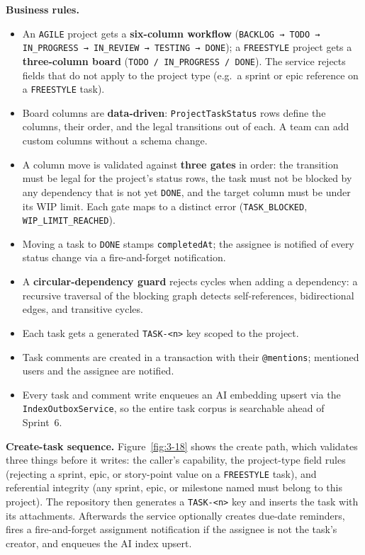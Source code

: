 \textbf{Business rules.}
\begin{itemize}
  \item An \texttt{AGILE} project gets a \textbf{six-column workflow}
    (\texttt{BACKLOG → TODO → IN\_PROGRESS → IN\_REVIEW → TESTING → DONE}); a \texttt{FREESTYLE}
    project gets a \textbf{three-column board} (\texttt{TODO / IN\_PROGRESS / DONE}). The service
    rejects fields that do not apply to the project type (e.g.\ a sprint or epic reference on a
    \texttt{FREESTYLE} task).
  \item Board columns are \textbf{data-driven}: \texttt{ProjectTaskStatus} rows define the columns,
    their order, and the legal transitions out of each. A team can add custom columns without a
    schema change.
  \item A column move is validated against \textbf{three gates} in order: the transition must be
    legal for the project's status rows, the task must not be blocked by any dependency that is not
    yet \texttt{DONE}, and the target column must be under its WIP limit. Each gate maps to a
    distinct error (\texttt{TASK\_BLOCKED}, \texttt{WIP\_LIMIT\_REACHED}).
  \item Moving a task to \texttt{DONE} stamps \texttt{completedAt}; the assignee is notified of
    every status change via a fire-and-forget notification.
  \item A \textbf{circular-dependency guard} rejects cycles when adding a dependency: a recursive
    traversal of the blocking graph detects self-references, bidirectional edges, and transitive
    cycles.
  \item Each task gets a generated \texttt{TASK-<n>} key scoped to the project.
  \item Task comments are created in a transaction with their \texttt{@mentions}; mentioned users
    and the assignee are notified.
  \item Every task and comment write enqueues an AI embedding upsert via the
    \texttt{IndexOutboxService}, so the entire task corpus is searchable ahead of Sprint~6.
\end{itemize}

\textbf{Create-task sequence.} Figure~\ref{fig:3-18} shows the create path, which validates
three things before it writes: the caller's capability, the project-type field rules (rejecting a
sprint, epic, or story-point value on a \texttt{FREESTYLE} task), and referential integrity (any
sprint, epic, or milestone named must belong to this project). The repository then generates a
\texttt{TASK-<n>} key and inserts the task with its attachments. Afterwards the service optionally
creates due-date reminders, fires a fire-and-forget assignment notification if the assignee is
not the task's creator, and enqueues the AI index upsert.

